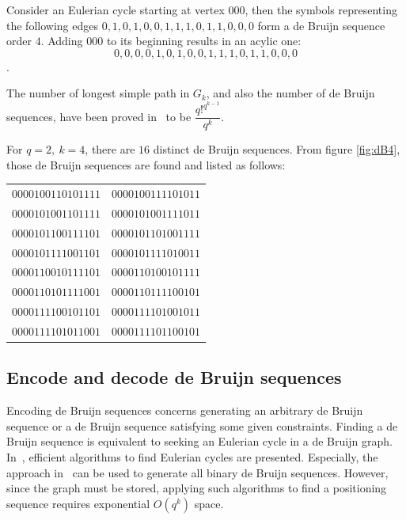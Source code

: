 \begin{example}
    Consider an Eulerian cycle starting at vertex $000$, then the symbols representing the following edges $0,1,0,1,0,0,1,1,1,0,1,1,0,0,0$ form a de Bruijn sequence order $4$. Adding $000$ to its beginning results in an acylic one: $$0,0,0,0,1,0,1,0,0,1,1,1,0,1,1,0,0,0$$.
\end{example} 

The number of longest simple path in $G_{k}$, and also the number of de Bruijn sequences, have been proved in~\cite{van1951circuits} to be $\dfrac{q!^{q^{k-1}}}{q^{k}}$.
\begin{example}
    For $q=2,\ k=4$, there are $16$ distinct de Bruijn sequences. From figure \ref{fig:dB4}, those de Bruijn sequences are found and listed as follows:   
    \begin{center}
        \begin{tabular}{c c}
            $0000100110101111$ & $0000100111101011$ \\
            $0000101001101111$ & $0000101001111011$ \\
            $0000101100111101$ & $0000101101001111$ \\
            $0000101111001101$ & $0000101111010011$ \\
            $0000110010111101$ & $0000110100101111$ \\
            $0000110101111001$ & $0000110111100101$ \\
            $0000111100101101$ & $0000111101001011$ \\
            $0000111101011001$ & $0000111101100101$ \\
        \end{tabular}
    \end{center}
\end{example}




\subsection{Encode and decode de Bruijn sequences}
Encoding de Bruijn sequences concerns generating an arbitrary de Bruijn sequence or a de Bruijn sequence satisfying some given constraints. Finding a de Bruijn sequence is equivalent to seeking an Eulerian cycle in a de Bruijn graph. In~\cite{fleury1883deux,hierholzer1873moglichkeit}, efficient algorithms to find Eulerian cycles are presented. Especially, the approach in~\cite{fleury1883deux} can be used to generate all binary de Bruijn sequences. However, since the graph must be stored, applying such algorithms to find a positioning sequence requires exponential $O(q^k)$ space.

